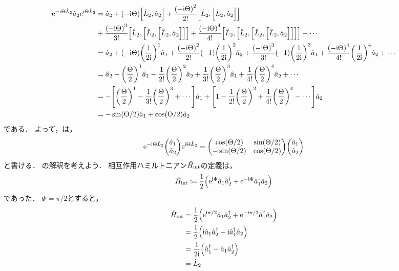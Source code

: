 \documentclass{report}
\begin{document}
    \begin{align}
      \mathrm{e}^{-\mathrm{i}\Theta\hat{L}_2}\hat{a}_2\mathrm{e}^{\mathrm{i}\Theta\hat{L}_2} &= \hat{a}_2 + \qty(-\mathrm{i}\Theta)\qty[\hat{L}_2, \hat{a}_2] + \frac{\qty(-\mathrm{i}\Theta)^2}{2!}\qty[\hat{L}_2, \qty[\hat{L}_2, \hat{a}_2]]\notag \\ 
      &+ \frac{\qty(-\mathrm{i}\Theta)^3}{3!}\qty[\hat{L}_2, \qty[\hat{L}_2, \qty[\hat{L}_2, \hat{a}_2]]] + \frac{\qty(-\mathrm{i}\Theta)^4}{4!}\qty[\hat{L}_2, \qty[\hat{L}_2, \qty[\hat{L}_2, \qty[\hat{L}_2, \hat{a}_2]]]] + \cdots \\ 
      &= \hat{a}_2 + \qty(-\mathrm{i}\Theta)\qty(\frac{1}{2\mathrm{i}})^1\hat{a}_1 + \frac{\qty(-\mathrm{i}\Theta)^2}{2!}\qty(-1)\qty(\frac{1}{2\mathrm{i}})^2\hat{a}_2 + \frac{\qty(-\mathrm{i}\Theta)^3}{3!}\qty(-1)\qty(\frac{1}{2\mathrm{i}})^3\hat{a}_1 + \frac{\qty(-\mathrm{i}\Theta)^4}{4!}\qty(\frac{1}{2\mathrm{i}})^4\hat{a}_2 + \cdots \\ 
      &= \hat{a}_2 - \qty(\frac{\Theta}{2})^1\hat{a}_1 - \frac{1}{2!}\qty(\frac{\Theta}{2})^2\hat{a}_2 + \frac{1}{3!}\qty(\frac{\Theta}{2})^3\hat{a}_1 + \frac{1}{4!}\qty(\frac{\Theta}{2})^4\hat{a}_2 + \cdots \\ 
      &= -\qty[\qty(\frac{\Theta}{2})^1 - \frac{1}{3!}\qty(\frac{\Theta}{2})^3 + \cdots]\hat{a}_1 + \qty[1 - \frac{1}{2!}\qty(\frac{\Theta}{2})^2 + \frac{1}{4!}\qty(\frac{\Theta}{2})^4 - \cdots]\hat{a}_2 \\ 
      &= -\sin(\Theta / 2)\hat{a}_1 + \cos(\Theta / 2)\hat{a}_2
    \end{align}
    である．
    よって，は，
    \begin{align}
      \e^{-\i\Theta\hat{L}_2}\mqty(\hat{a}_1 \\ \hat{a}_2)\e^{\i\Theta\hat{L}_2} = \mqty(
        \cos(\Theta / 2) & \sin(\Theta / 2) \\ 
        -\sin(\Theta / 2) & \cos(\Theta / 2)
      )\mqty(\hat{a}_1 \\ \hat{a}_2)\label{beam-splitter-hamiltonian-prep}
    \end{align}
    と書ける．
    の解釈を考えよう．
    相互作用ハミルトニアン$\hat{H}_{\mathrm{int}}$の定義は，
    \begin{align}
      \hat{H}_{\mathrm{int}} \coloneqq \frac{1}{2}\qty(\mathrm{e}^{\mathrm{i}\Phi}\hat{a}_1\hat{a}_2^{\dag} + \mathrm{e}^{-\mathrm{i}\Phi}\hat{a}_1^{\dag}\hat{a}_2)
    \end{align}
    であった．
    $\Phi = \pi / 2$とすると，
    \begin{align}
      \hat{H}_{\mathrm{int}} &= \frac{1}{2}\qty(\mathrm{e}^{\mathrm{i}\pi / 2}\hat{a}_1\hat{a}_2^{\dag} + \mathrm{e}^{-\mathrm{i}\pi / 2}\hat{a}_1^{\dag}\hat{a}_2) \\ 
      &= \frac{1}{2}\qty(\mathrm{i}\hat{a}_1\hat{a}_2^{\dag} - \mathrm{i}\hat{a}_1^{\dag}\hat{a}_2) \\ 
      &= \frac{1}{2\mathrm{i}}\qty(\hat{a}_1^{\dag} - \hat{a}_1\hat{a}_2^{\dag}) \\ 
      &= \hat{L}_2
    \end{align}
\end{document}
